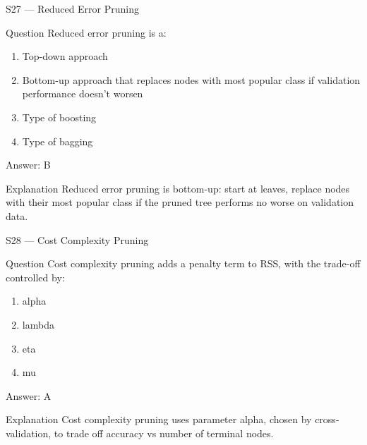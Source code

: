 \documentclass[aspectratio=169,8pt]{beamer}
\begin{document}
	\begin{frame}{S27 --- Reduced Error Pruning}
		\begin{block}{Question}
			Reduced error pruning is a:
			\begin{enumerate}
				\item Top-down approach
				\item Bottom-up approach that replaces nodes with most popular class if validation performance doesn't worsen
				\item Type of boosting
				\item Type of bagging
			\end{enumerate}
		\end{block}
		\begin{exampleblock}{Answer: B}\end{exampleblock}
		\begin{block}{Explanation}
			Reduced error pruning is bottom-up: start at leaves, replace nodes with their most popular class if the pruned tree performs no worse on validation data.
		\end{block}
	\end{frame}
	
	\begin{frame}{S28 --- Cost Complexity Pruning}
		\begin{block}{Question}
			Cost complexity pruning adds a penalty term to RSS, with the trade-off controlled by:
			\begin{enumerate}
				\item alpha
				\item lambda
				\item eta
				\item mu
			\end{enumerate}
		\end{block}
		\begin{exampleblock}{Answer: A}\end{exampleblock}
		\begin{block}{Explanation}
			Cost complexity pruning uses parameter alpha, chosen by cross-validation, to trade off accuracy vs number of terminal nodes.
		\end{block}
	\end{frame}
	
\end{document}
